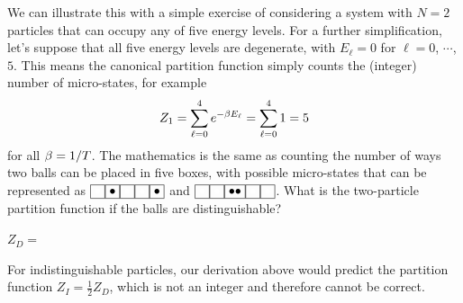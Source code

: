 We can illustrate this with a simple exercise of considering a system with $N = 2$ particles that can occupy any of five energy levels.
For a further simplification, let's suppose that all five energy levels are degenerate, with $E_{\ell} = 0$ for $\ell = 0$, $\cdots$, $5$.
This means the canonical partition function simply counts the (integer) number of micro-states, for example
\begin{equation*}
  Z_1 = \sum_{\ell = 0}^4 e^{-\beta E_{\ell}} = \sum_{\ell = 0}^4 1 = 5
\end{equation*}
for all $\beta = 1 / T$.
The mathematics is the same as counting the number of ways two balls can be placed in five boxes, with possible micro-states that can be represented as $\boxzero\boxone\boxzero\boxzero\boxone$ and $\boxzero\boxzero\boxtwo\boxzero\boxzero$.
What is the two-particle partition function if the balls are distinguishable?
\begin{mdframed}
  $Z_D = $ \\[24 pt]
\end{mdframed}
For indistinguishable particles, our derivation above would predict the partition function $Z_I = \frac{1}{2} Z_D$, which is not an integer and therefore cannot be correct.

